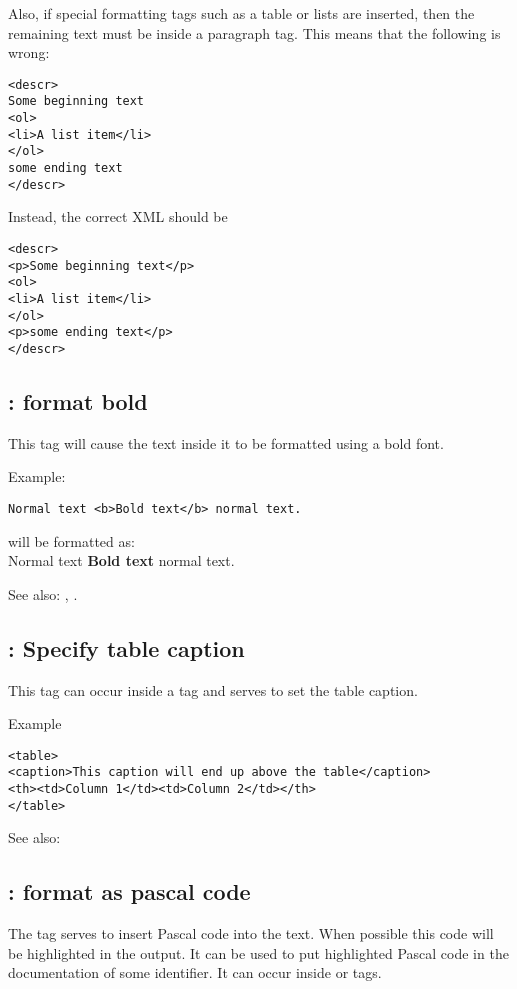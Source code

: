 Also, if special formatting tags such as a table or lists are inserted, then
the remaining text must be inside a paragraph tag. This means that the
following is wrong:
\begin{verbatim}
<descr>
Some beginning text
<ol>
<li>A list item</li>
</ol>
some ending text
</descr>
\end{verbatim}
Instead, the correct XML should be
\begin{verbatim}
<descr>
<p>Some beginning text</p>
<ol>
<li>A list item</li>
</ol>
<p>some ending text</p>
</descr>
\end{verbatim}

\subsection{ : format bold}
\label{tag:b}
This tag will cause the text inside it to be formatted using a bold font.

Example:
\begin{verbatim}
Normal text <b>Bold text</b> normal text.
\end{verbatim}
will be formatted as:\\
Normal text \textbf{Bold text} normal text.

See also: , .

\subsection{ : Specify table caption}
\label{tag:caption}
This tag can occur inside a  tag and serves to set the table 
caption.

Example
\begin{verbatim}
<table>
<caption>This caption will end up above the table</caption>
<th><td>Column 1</td><td>Column 2</td></th>
</table>
\end{verbatim}

See also: 

\subsection{ : format as pascal code}
\label{tag:code}
The  tag serves to insert Pascal code into the text. When possible
this code will be highlighted in the output. It can be used to put
highlighted Pascal code in the documentation of some identifier. It can
occur inside  or  tags.

